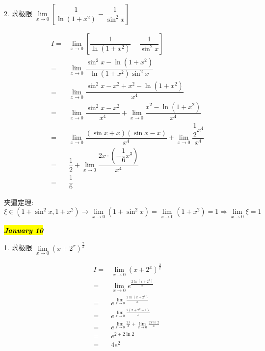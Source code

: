 2. 求极限 $\lim\limits_{x\to 0}\left[\dfrac{1}{\ln(1+x^{2})}-\dfrac{1}{\sin^{2}x}\right]$
\begin{solution}

	\begin{align*}
		I = & \lim\limits_{x\to 0}\left[\dfrac{1}{\ln(1+x^{2})}-\dfrac{1}{\sin^{2}x}\right]\\
		  = & \lim\limits_{x\to 0}\dfrac{\sin^{2}x-\ln(1+x^{2})}{\ln(1+x^{2})\sin^{2}x}\\
		  = & \lim\limits_{x\to 0}\dfrac{\sin^{2}x-x^{2}+x^{2}-\ln(1+x^{2})}{x^{4}}\\
		  = & \lim\limits_{x\to 0}\dfrac{\sin^{2}x-x^{2}}{x^{4}}+\lim\limits_{x\to 0}\dfrac{x^{2}-\ln(1+x^{2})}{x^{4}}\\
		  = & \lim\limits_{x\to 0}\dfrac{(\sin x+x)(\sin x-x)}{x^{4}}+\lim\limits_{x\to 0}\dfrac{\dfrac{1}{2}x^{4}}{x^{4}}\\
		  = & \dfrac{1}{2}+\lim\limits_{x\to 0}\dfrac{2x\cdot(-\dfrac{1}{6}x^{3})}{x^{4}}\\ 
		  = & \dfrac{1}{6}
	\end{align*}
	
	夹逼定理: 
	$$\xi\in(1+\sin^{2}x,1+x^{2})\to \lim\limits_{x\to 0}(1+\sin^{2}x) = \lim\limits_{x\to 0} (1+x^{2}) = 1\Rightarrow \lim\limits_{x\to 0}\xi = 1$$
\end{solution}
\hl{\textbf{\textit{January 10}}}

1. 求极限 $\lim\limits_{x\to 0}\left(x+2^{x}\right)^{\frac{2}{x}}$
\begin{solution}
	
	\begin{align*}
		I = & \lim\limits_{x\to 0}(x+2^{x})^{\frac{2}{x}}\\
		  = & \lim\limits_{x\to 0}e^{\frac{2\ln(x+2^{x})}{x}}\\
		  = & e^{\lim\limits_{x\to 0}\frac{2\ln(x+2^{x})}{x}}\\
		  = & e^{\lim\limits_{x\to 0}\frac{2(x+2^{x}-1)}{x}}\\
		  = & e^{\lim\limits_{x\to 0}\frac{2x}{x}+\lim\limits_{x\to 0}\frac{2x\ln 2}{x}}\\
		  = & e^{2+2\ln 2}\\
		  = & 4e^{2}
	\end{align*}
\end{solution}

